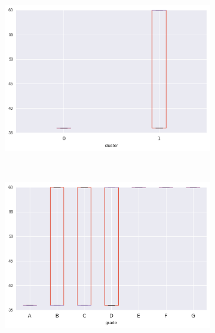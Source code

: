 \begin{apendicesenv}
\begin{figure}[t!]
\begin{subfigure}[t]{0.5\textwidth}
			\centerline{\includegraphics[width=1\textwidth]{img/term_float_by_cluster}}
    	\end{subfigure}%
    	~ 
    	\begin{subfigure}[t]{0.5\textwidth}
    		\centering
   
			\centerline{\includegraphics[width=1\textwidth]{img/term_float_by_grade}}

    	\end{subfigure}
    	\\
    	        \caption{loan\textunderscore amnt}
    	\begin{subfigure}[t]{0.5\textwidth}
    		\centering


\end{subfigure}
\end{figure}
\end{apendicesenv}
